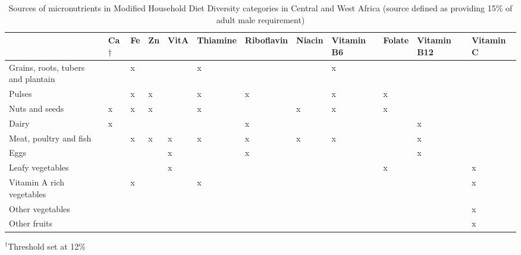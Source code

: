 \begin{table}[H]
  \captionsetup{singlelinecheck = false, justification=justified}
  \caption{Sources of micronutrients in Modified Household Diet Diversity categories in Central and West Africa (source defined as providing 15\% of adult male requirement)}
  \label{tab:C_5}
  \small
\begin{tabularx}{\textwidth}%
  {
p{}
p{}
p{}
p{}
p{}
p{}
p{}
p{}
p{}
p{}
p{}
p{}}
\toprule
~ & Ca${\dag}$ & Fe & Zn & VitA & Thiamine & Riboflavin & Niacin & Vitamin B6 & Folate & Vitamin B12 & Vitamin C \\
\midrule
Grains, roots, tubers and plantain & & x & & & x & & & x & & & \\
Pulses & & x & x & & x & x & & x & x & & \\
Nuts and seeds & x & x & x & & x & & x & x & x & & \\
Dairy & x & & & & & x & & & & x & \\
Meat, poultry and fish & & x & x & x & x & x & x & x & & x & \\
Eggs & & & & x & & x & & & & x & \\
Leafy vegetables & & & & x & & & & & x & & x \\
Vitamin A rich vegetables & & x & & & x & & & & & & x \\
Other vegetables & & & & & & & & & & & x \\
Other fruits & & & & & & & & & & & x \\
\bottomrule
\end{tabularx}
\footnotesize
\raggedright
$^{\dag}$Threshold set at 12\%
\end{table}

